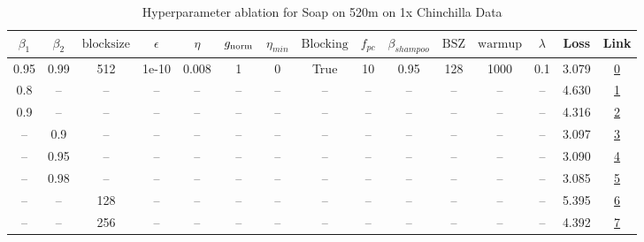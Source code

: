 \begin{table}[H]
\centering
\caption{Hyperparameter ablation for Soap on 520m on 1x Chinchilla Data}
\label{tab:ablation_soap_520m_on_1x_chinchilla_data}
\begin{tabular}{ccccccccccccccc}
\toprule
$\beta_1$ & $\beta_2$ & $\mathrm{block size}$ & $\epsilon$ & $\eta$ & $g_{\mathrm{norm}}$ & $\eta_{min}$ & $\mathrm{Blocking}$ & $f_{pc}$ & $\beta_{shampoo}$ & $\mathrm{BSZ}$ & $\mathrm{warmup}$ & $\lambda$ & Loss & Link \\
\midrule
0.95 & 0.99 & 512 & 1e-10 & 0.008 & 1 & 0 & True & 10 & 0.95 & 128 & 1000 & 0.1 & 3.079 & \href{https://wandb.ai/marin-community/optimizer-scaling/runs/sweep-520m-10B-soape9baa74lr0.008-wd0.1-minlr0-warmup1000-b10.95-8d30a7}{0} \\
\midrule
0.8 & -- & -- & -- & -- & -- & -- & -- & -- & -- & -- & -- & -- & 4.630 & \href{https://wandb.ai/marin-community/optimizer-scaling/runs/sweep-520m-10B-soapere54bb4blr0.008-wd0.1-minlr0-warmup1000-b10.-11ddc5}{1} \\
0.9 & -- & -- & -- & -- & -- & -- & -- & -- & -- & -- & -- & -- & 4.316 & \href{https://wandb.ai/marin-community/optimizer-scaling/runs/sweep-520m-10B-soapeb38cf8lr0.008-wd0.1-minlr0-warmup1000-b10.9--fcc21b}{2} \\
-- & 0.9 & -- & -- & -- & -- & -- & -- & -- & -- & -- & -- & -- & 3.097 & \href{https://wandb.ai/marin-community/optimizer-scaling/runs/sweep-520m-10B-soapere54bd5flr0.008-wd0.1-minlr0-warmup1000-b10.-4d6d54}{3} \\
-- & 0.95 & -- & -- & -- & -- & -- & -- & -- & -- & -- & -- & -- & 3.090 & \href{https://wandb.ai/marin-community/optimizer-scaling/runs/sweep-520m-10B-soapere42c49clr0.008-wd0.1-minlr0-warmup1000-b10.-842d20}{4} \\
-- & 0.98 & -- & -- & -- & -- & -- & -- & -- & -- & -- & -- & -- & 3.085 & \href{https://wandb.ai/marin-community/optimizer-scaling/runs/sweep-520m-10B-soapere2ba10alr0.008-wd0.1-minlr0-warmup1000-b10.-db6073}{5} \\
-- & -- & 128 & -- & -- & -- & -- & -- & -- & -- & -- & -- & -- & 5.395 & \href{https://wandb.ai/marin-community/optimizer-scaling/runs/sweep-520m-10B-soaperef56540lr0.008-wd0.1-minlr0-warmup1000-b10.-996e37}{6} \\
-- & -- & 256 & -- & -- & -- & -- & -- & -- & -- & -- & -- & -- & 4.392 & \href{https://wandb.ai/marin-community/optimizer-scaling/runs/sweep-520m-10B-soapere3d9681lr0.008-wd0.1-minlr0-warmup1000-b10.-0caed5}{7} \\

\end{tabular}
\end{table}
